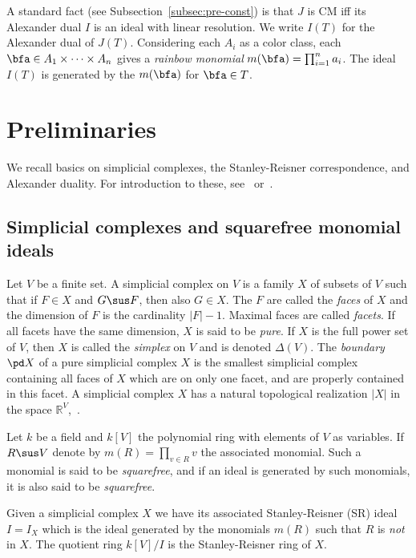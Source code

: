   A standard fact (see Subsection~\ref{subsec:pre-const})
  is that $J$ is CM iff its Alexander dual $I$ is an ideal with linear
  resolution. We write $I(T)$ for the Alexander dual of $J(T)$. 
    Considering each $A_i$ as a color class, each
  $\bfa \in A_1 \times \cdots \times A_n$ gives
  a {\it rainbow monomial} $m(\bfa) = \prod_{i=1}^n a_i$.
  The ideal $I(T)$ is generated by the $m(\bfa)$ for $\bfa \in T$.

\setcounter{section}{1}\setcounter{subsection}{0}
\section{Preliminaries}
\label{sec:pre}
We recall basics on simplicial complexes,
the Stanley-Reisner correspondence, and Alexander duality.
For introduction to these, see~\cite{HeHi, MiSt} or~\cite[Sec.II.5]{BH93}.

\subsection{Simplicial complexes and squarefree monomial ideals}
Let $V$ be a finite set. A simplicial complex on $V$ is
a family $X$ of subsets of $V$ such that if $F \in X$
and $G \sus F$, then also $G \in X$. The $F$ are called the
{\it faces} of $X$ and the dimension of $F$ is the cardinality $|F| -1$.
Maximal faces are called {\it facets}. If all facets have the same
dimension, $X$ is said to be {\it pure}.
If $X$ is the full power set of $V$, then
$X$ is called the {\it simplex} on $V$ and is denoted $\Delta(V)$. 
The {\it boundary $\pd X$} of a pure
simplicial complex $X$ is the smallest simplicial
complex containing all faces of $X$ which are on only one facet, and
are properly contained in this facet.
A simplicial complex $X$ has a natural topological realization $|X|$ in the
space ${\mathbb R}^V$,~\cite{Mun}.

Let $k$ be a field and $k[V]$ the polynomial ring with elements of $V$
as variables. If $R \sus V$ denote by $m(R) = \prod_{v \in R} v$ the
associated monomial. Such a monomial is said to be {\it squarefree},
and if an ideal is generated by such monomials, it is also said to be
{\it squarefree}.



Given a simplicial complex $X$ we have its associated Stanley-Reisner (SR)
ideal $I= I_X$ which is the ideal generated by the monomials
$m(R)$ such that $R$ is {\it not} in $X$. The quotient ring $k[V]/I$ is
the Stanley-Reisner ring of $X$.

